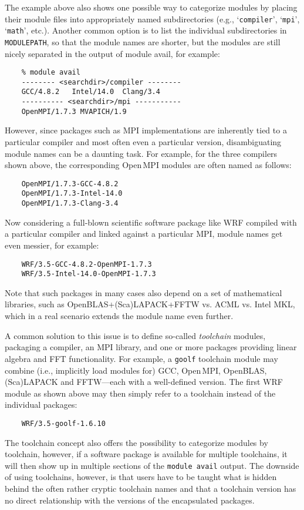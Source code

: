The example above also shows one possible way to categorize modules by
placing their module files into appropriately named subdirectories (e.g.,
`\texttt{compiler}', `\texttt{mpi}', `\texttt{math}', etc.). Another common
option is to list the individual subdirectories in \texttt{MODULEPATH}, so
that the module names are shorter, but the modules are still nicely separated
in the output of module avail, for example:
\begin{verbatim}
    % module avail
    -------- <searchdir>/compiler --------
    GCC/4.8.2   Intel/14.0  Clang/3.4
    ---------- <searchdir>/mpi -----------
    OpenMPI/1.7.3 MVAPICH/1.9
\end{verbatim}

However, since packages such as MPI implementations are inherently tied to a
particular compiler and most often even a particular version, disambiguating
module names can be a daunting task. For example, for the three compilers
shown above, the corresponding Open\,MPI modules are often named as follows:
\begin{verbatim}
    OpenMPI/1.7.3-GCC-4.8.2
    OpenMPI/1.7.3-Intel-14.0
    OpenMPI/1.7.3-Clang-3.4
\end{verbatim}

Now considering a full-blown scientific software package like WRF compiled
with a particular compiler and linked against a particular MPI, module names
get even messier, for example:
\begin{verbatim}
    WRF/3.5-GCC-4.8.2-OpenMPI-1.7.3
    WRF/3.5-Intel-14.0-OpenMPI-1.7.3
\end{verbatim}
Note that such packages in many cases also depend on a set of mathematical
libraries, such as OpenBLAS+(Sca)LAPACK+FFTW vs. ACML vs. Intel MKL, which in a
real scenario extends the module name even further.

A common solution to this issue is to define so-called \emph{toolchain}
modules, packaging a compiler, an MPI library, and one or more packages
providing linear algebra and FFT functionality. For example, a \texttt{goolf}
toolchain module may combine (i.e., implicitly load modules for) GCC,
Open\,MPI, OpenBLAS, (Sca)LAPACK and FFTW---each with a well-defined version. The
first WRF module as shown above may then simply refer to a toolchain instead of the
individual packages:
\begin{verbatim}
    WRF/3.5-goolf-1.6.10
\end{verbatim}
The toolchain concept also offers the possibility to categorize modules by
toolchain, however, if a software package is available for multiple
toolchains, it will then show up in multiple sections of the \texttt{module
avail} output. The downside of using toolchains, however, is that users have
to be taught what is hidden behind the often rather cryptic toolchain names
and that a toolchain version has no direct relationship with the versions of
the encapsulated packages.

